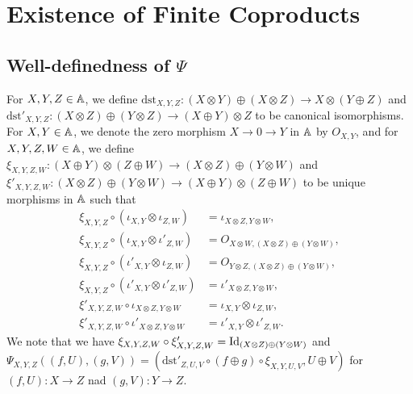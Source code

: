 \section{Existence of Finite Coproducts}

\subsection{Well-definedness of $\Psi$}

For $X,Y,Z \in \mathbb{A}$, we define $\mathrm{dst}_{X,Y,Z} \colon (X \otimes Y)
\oplus (X \otimes Z) \to X \otimes (Y \oplus Z)$ and $\mathrm{dst}'_{X,Y,Z}
\colon (X \otimes Z) \oplus (Y \otimes Z) \to (X \oplus Y) \otimes Z$ to be
canonical isomorphisms.  For $X,Y \in \mathbb{A}$, we denote the zero morphism $X
\longrightarrow 0 \longrightarrow Y$ in $\mathbb{A}$ by $O_{X,Y}$, and for
$X,Y,Z,W \in \mathbb{A}$, we define $\xi_{X,Y,Z,W} \colon (X \oplus Y) \otimes (Z
\oplus W) \to (X \otimes Z) \oplus (Y \otimes W)$ and $\xi'_{X,Y,Z,W} \colon (X
\otimes Z) \oplus (Y \otimes W) \to (X \oplus Y) \otimes (Z \oplus W)$ to be
unique morphisms in $\mathbb{A}$ such that
\begin{align*}
  \xi_{X,Y,Z} \circ (\iota_{X,Y} \otimes \iota_{Z,W}) &= \iota_{X \otimes Z,Y \otimes W}, \\
  \xi_{X,Y,Z} \circ (\iota_{X,Y} \otimes \iota'_{Z,W}) &=
  O_{X \otimes W,(X \otimes Z) \oplus (Y \otimes W)}, \\
  \xi_{X,Y,Z} \circ (\iota'_{X,Y} \otimes \iota_{Z,W}) &=
  O_{Y \otimes Z,(X \otimes Z) \oplus (Y \otimes W)}, \\
  \xi_{X,Y,Z} \circ (\iota'_{X,Y} \otimes \iota'_{Z,W}) &=
  \iota'_{X \otimes Z,Y \otimes W}, \\
  \xi'_{X,Y,Z,W} \circ \iota_{X \otimes Z,Y \otimes W} &= \iota_{X,Y} \otimes \iota_{Z,W}, \\
  \xi'_{X,Y,Z,W} \circ \iota'_{X \otimes Z,Y \otimes W} &= \iota'_{X,Y} \otimes \iota'_{Z,W}.
\end{align*}
We note that we have $\xi_{X,Y,Z,W} \circ \xi'_{X,Y,Z,W} = \mbox{\normalfont Id}_{(X \otimes Z)
\oplus (Y \otimes W)}$ and $\Psi_{X,Y,Z}((f,U),(g,V)) =
(\mathrm{dst}'_{Z,U,V} \circ (f \oplus g) \circ \xi_{X,Y,U,V},U \oplus V)$
for $(f,U) \colon X \to Z$ nad $(g,V) \colon Y \to Z$.

